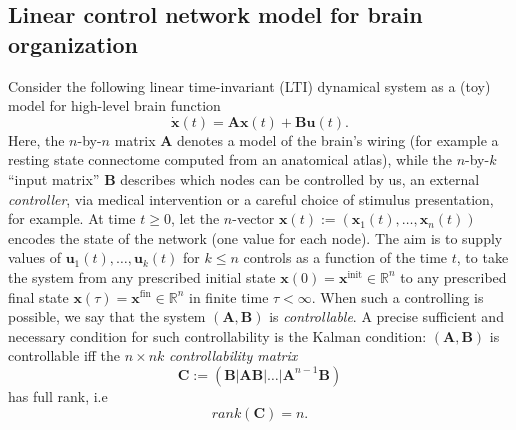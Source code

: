 \documentclass{article} %
\def\B#1{\bm{#1}}
\def\u{\mathbf{u}}
\def\A{\mathbf{A}}
\def\B{\mathbf{B}}
\def\C{\mathbf{C}}
\def\x{\mathbf{x}}
\begin{document}
\subsection{Linear control network model for brain organization}
Consider the following linear time-invariant (LTI) dynamical system as a (toy) model for high-level brain function
\begin{equation}
  \dot{\x}(t) = \A\x(t) + \B\u(t).
  \label{eq:lti}
\end{equation}
Here, the $n$-by-$n$ matrix $\A$ denotes a model of the brain's wiring (for example a resting state connectome computed from an anatomical atlas), while the $n$-by-$k$ ``input matrix'' $\B$ describes which nodes can be controlled by us, an external \textit{controller}, via medical intervention or a careful choice of stimulus presentation, for example.
At time $t \ge 0$, let  the $n$-vector  $\x(t) := (\x_1(t),\ldots,\x_n(t))$ encodes the state of the network (one value for each node). The aim is to supply values of $\u_1(t),\ldots,\u_k(t)$ for $k \le n$ controls as a function of the time $t$,  to take the system from any prescribed initial state $\x(0) = \x^{\text{init}} \in \mathbb R^n$ to any prescribed final state $\x(\tau) = \x^{\text{fin}} \in \mathbb R^n$ in finite time $\tau < \infty$.
When such a controlling is possible, we say that the system $(\A,\B)$ is \textit{controllable}. A precise sufficient and necessary condition for such controllability is the Kalman condition: $(\A,\B)$ is controllable iff the $n \times nk$ \textit{controllability matrix}
\begin{equation}
  \C := (\B|\A\B|\ldots|\A^{n-1}\B)
\end{equation}
has full rank, i.e
\begin{equation}
  rank(\C) = n.
\end{equation}
\end{document}
